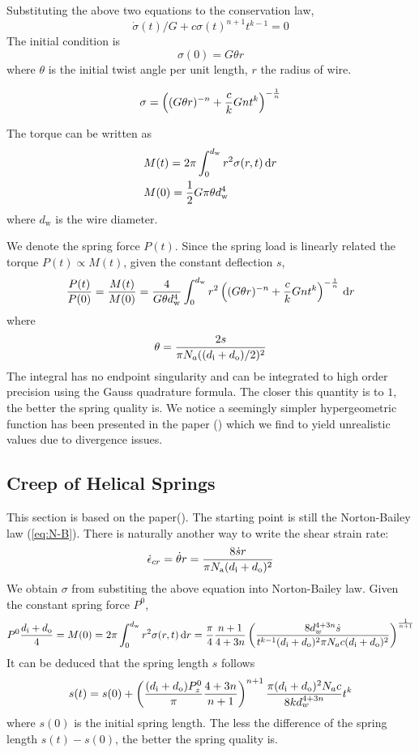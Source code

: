 \documentclass[10pt]{article}
\begin{document}
Substituting the above two equations to the conservation law,
\begin{equation} \label{eq:diff}
\dot{\sigma}(t)/G+c\sigma(t)^{n+1} t^{k-1}=0
\end{equation}
The initial condition is
\[
\sigma (0) = G\theta r
\]
where $\theta$ is the initial twist angle per unit length, $r$ the radius of wire.

\[
\sigma = \left( (G\theta r)^{-n} + {c\over k} Gnt^k \right)^{-{1\over n}}
\]

The torque can be written as
\begin{align*}
&M(t) = 2\pi \int_0^{d_{\text{w}}} r^2 \sigma(r,t)\,\mathrm{d} r\\
&M(0)={1\over 2} G\pi\theta d_{\text{w}}^4
\end{align*}
where $d_{\text{w}}$ is the wire diameter.

We denote the spring force $P(t)$. Since the spring load is linearly related the torque $P(t)\propto M(t)$, given the constant deflection $s$,
\[
{P(t)\over P(0)} = {M(t)\over M(0)} = {4\over G\theta d_{\text{w}}^4}\int_0^{d_{\text{w}}} r^2 \left( (G\theta r)^{-n} + {c\over k} Gnt^k \right)^{-{1\over n}} \,\mathrm{d} r
\]
where
\[
\theta = {2s\over \pi N_a ((d_{\text{i}}+d_{\text{o}})/2)^2}
\]
The integral has no endpoint singularity and can be integrated to high order precision using the Gauss quadrature formula. The closer this quantity is to $1$, the better the spring quality is. We notice a seemingly simpler hypergeometric function has been presented in the paper (\cite{Ko2014}) which we find to yield unrealistic values due to divergence issues.


\subsection{Creep of Helical Springs}
This section is based on the paper(\cite{Relaxation3}). The starting point is still the Norton-Bailey law (\ref{eq:N-B}). There is naturally another way to write the shear strain rate:
\[
\dot{\epsilon}_{cr} = \dot{\theta} r = {8\dot{s} r\over \pi N_{\text{a}} (d_{\text{i}}+d_{\text{o}})^2}
\]
We obtain $\sigma$ from substiting the above equation into Norton-Bailey law. Given the constant spring force $P^0$,
\[
P^0{d_{\text{i}}+d_{\text{o}}\over 4}=M(0)=2\pi\int_0^{d_{\text{w}}} r^2 \sigma(r,t)\,\mathrm{d} r
={\pi\over 4}{n+1\over 4+3n}\left( {8d_w^{4+3n}\dot{s} \over t^{k-1} (d_{\text{i}}+d_{\text{o}})^2 \pi N_a c (d_{\text{i}}+d_{\text{o}})^2} \right)^{{1\over n+1}}
\]
It can be deduced that the spring length $s$ follows
\[
s(t) = s(0) + \left( {(d_{\text{i}}+d_{\text{o}})P_z^0\over \pi}{4+3n\over n+1} \right)^{n+1} {\pi (d_{\text{i}}+d_{\text{o}})^2 N_a c\over 8kd_w^{4+3n}} t^k
\]
where $s(0)$ is the initial spring length. The less the difference of the spring length $s(t)-s(0)$, the better the spring quality is.
 
 \cite{Ch2000} \cite{Relaxation1} \cite{Relaxation2} \cite{Relaxation3} \cite{Creep} 




\vfill\pagebreak


	
	


\end{document}
